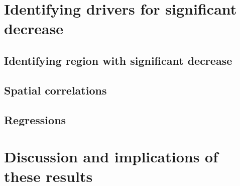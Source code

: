 \documentclass[../main.tex]{subfiles}
\begin{document}
\FloatBarrier
\section{Identifying drivers for significant decrease}

\FloatBarrier
\subsection{Identifying region with significant decrease}

\FloatBarrier
\subsection{Spatial correlations}

\FloatBarrier
\subsection{Regressions}

\FloatBarrier
\section{Discussion and implications of these results}
\end{document}
